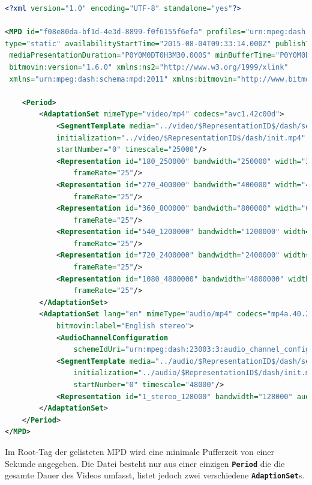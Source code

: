 \documentclass[paper = a4, fontsize = 12pt, parskip = half]{scrartcl} %
\def\elem#1{\texttt{\textbf{#1}}}
\begin{document}
\begin{lstlisting}[language=XML,basicstyle=\small]
<?xml version="1.0" encoding="UTF-8" standalone="yes"?>

<MPD id="f08e80da-bf1d-4e3d-8899-f0f6155f6efa" profiles="urn:mpeg:dash:profile:isoff-main:2011"
type="static" availabilityStartTime="2015-08-04T09:33:14.000Z" publishTime="2015-08-04T10:47:32.000Z"
 mediaPresentationDuration="P0Y0M0DT0H3M30.000S" minBufferTime="P0Y0M0DT0H0M1.000S" 
 bitmovin:version="1.6.0" xmlns:ns2="http://www.w3.org/1999/xlink" 
 xmlns="urn:mpeg:dash:schema:mpd:2011" xmlns:bitmovin="http://www.bitmovin.net/mpd/2015">

    <Period>
        <AdaptationSet mimeType="video/mp4" codecs="avc1.42c00d">
            <SegmentTemplate media="../video/$RepresentationID$/dash/segment_$Number$.m4s" 
            initialization="../video/$RepresentationID$/dash/init.mp4" duration="100000" 
            startNumber="0" timescale="25000"/>
            <Representation id="180_250000" bandwidth="250000" width="320" height="180" 
                frameRate="25"/>
            <Representation id="270_400000" bandwidth="400000" width="480" height="270"  
                frameRate="25"/>
            <Representation id="360_800000" bandwidth="800000" width="640" height="360" 
                frameRate="25"/>
            <Representation id="540_1200000" bandwidth="1200000" width="960" height="540"  
                frameRate="25"/>
            <Representation id="720_2400000" bandwidth="2400000" width="1280" height="720"  
                frameRate="25"/>
            <Representation id="1080_4800000" bandwidth="4800000" width="1920" height="1080" 
                frameRate="25"/>
        </AdaptationSet>
        <AdaptationSet lang="en" mimeType="audio/mp4" codecs="mp4a.40.2" 
			bitmovin:label="English stereo">
            <AudioChannelConfiguration 
                schemeIdUri="urn:mpeg:dash:23003:3:audio_channel_configuration:2011" value="2"/>
            <SegmentTemplate media="../audio/$RepresentationID$/dash/segment_$Number$.m4s" 
                initialization="../audio/$RepresentationID$/dash/init.mp4" duration="191472" 
                startNumber="0" timescale="48000"/>
            <Representation id="1_stereo_128000" bandwidth="128000" audioSamplingRate="48000"/>
        </AdaptationSet>
    </Period>
</MPD>
\end{lstlisting}

Im Root-Tag der gelisteten MPD wird eine minimale Pufferzeit von einer Sekunde angegeben. Die Datei besteht nur aus einer einzigen \elem{Period} die die gesamte Dauer des Videos umfasst, listet jedoch zwei verschiedene \elem{AdaptionSet}s. 
\end{document}
